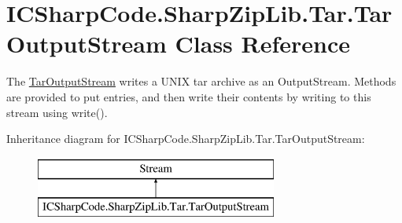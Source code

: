 \hypertarget{class_i_c_sharp_code_1_1_sharp_zip_lib_1_1_tar_1_1_tar_output_stream}{}\section{I\+C\+Sharp\+Code.\+Sharp\+Zip\+Lib.\+Tar.\+Tar\+Output\+Stream Class Reference}
\label{class_i_c_sharp_code_1_1_sharp_zip_lib_1_1_tar_1_1_tar_output_stream}


The \hyperlink{class_i_c_sharp_code_1_1_sharp_zip_lib_1_1_tar_1_1_tar_output_stream}{Tar\+Output\+Stream} writes a U\+N\+IX tar archive as an Output\+Stream. Methods are provided to put entries, and then write their contents by writing to this stream using write().  


Inheritance diagram for I\+C\+Sharp\+Code.\+Sharp\+Zip\+Lib.\+Tar.\+Tar\+Output\+Stream\+:\begin{figure}[H]
\begin{center}
\leavevmode
\includegraphics[height=2.000000cm]{class_i_c_sharp_code_1_1_sharp_zip_lib_1_1_tar_1_1_tar_output_stream}
\end{center}
\end{figure}

